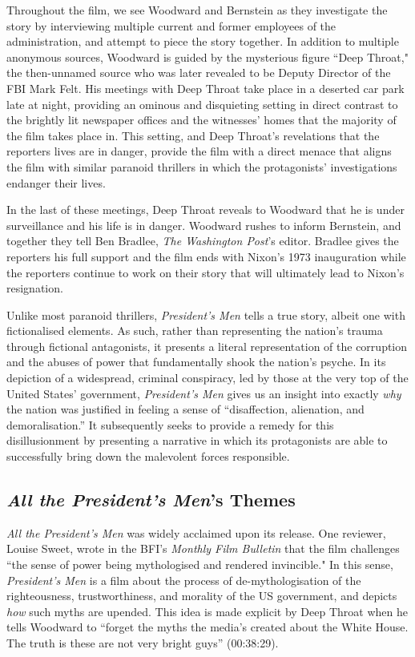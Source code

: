 Throughout the film, we see Woodward and Bernstein as they investigate the story by interviewing multiple current and former employees of the administration, and attempt to piece the story together.
In addition to multiple anonymous sources, Woodward is guided by the mysterious figure ``Deep Throat," the then-unnamed source who was later revealed to be Deputy Director of the FBI Mark Felt.
His meetings with Deep Throat take place in a deserted car park late at night, providing an ominous and disquieting setting in direct contrast to the brightly lit newspaper offices and the witnesses' homes that the majority of the film takes place in.
This setting, and Deep Throat's revelations that the reporters lives are in danger, provide the film with a direct menace that aligns the film with similar paranoid thrillers in which the protagonists' investigations endanger their lives.

In the last of these meetings, Deep Throat reveals to Woodward that he is under surveillance and his life is in danger.
Woodward rushes to inform Bernstein, and together they tell Ben Bradlee, \textit{The Washington Post}'s editor.
Bradlee gives the reporters his full support and the film ends with Nixon's 1973 inauguration while the reporters continue to work on their story that will ultimately lead to Nixon's resignation.

Unlike most paranoid thrillers, \textit{President's Men} tells a true story, albeit one with fictionalised elements.
As such, rather than representing the nation's trauma through fictional antagonists, it presents a literal representation of the corruption and the abuses of power that fundamentally shook the nation's psyche.
In its depiction of a widespread, criminal conspiracy, led by those at the very top of the United States’ government, \textit{President’s Men} gives us an insight into exactly \textit{why }the nation was justified in feeling a sense of ``disaffection, alienation, and demoralisation.”\autocites[][296]{keathley_trapped_2004}
It subsequently seeks to provide a remedy for this disillusionment by presenting a narrative in which its protagonists are able to successfully bring down the malevolent forces responsible.

\subsection{\textit{All the President's Men}'s Themes} \label{sec:president-themes}

\textit{All the President's Men} was widely acclaimed upon its release.
One reviewer, Louise Sweet, wrote in the BFI's \textit{Monthly Film Bulletin} that the film challenges ``the sense of power being mythologised and rendered invincible."\autocites[][95]{sweet_all_1976}
In this sense, \textit{President’s Men} is a film about the process of de-mythologisation of the righteousness, trustworthiness, and morality of the US government, and depicts \textit{how} such myths are upended. 
This idea is made explicit by Deep Throat when he tells Woodward to ``forget the myths the media’s created about the White House. The truth is these are not very bright guys” (00:38:29).

